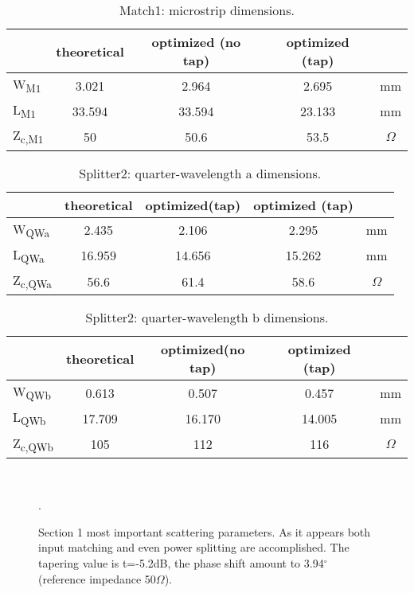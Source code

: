 \begin{table} [h]
	\label{tab:21_sec2DimM1}
	\caption{Match1: microstrip dimensions.}
	\centering	
	\begin{tabular}{lcccc} 
		\toprule
		& theoretical & optimized (no tap)& optimized (tap)&\\
		\midrule 
		W\textsubscript{M1} 	&	3.021		&	2.964	&2.695& mm 		\\
		L\textsubscript{M1}		&	33.594		& 	33.594	&23.133& mm		\\ 
		Z\textsubscript{c,M1}	&	50			& 	50.6	&53.5& $\Omega$		\\
		\bottomrule
	\end{tabular}	
\end{table}
\begin{table} [h!]
	\label{tab:p2_sec2DimQWa}
	\caption{Splitter2: quarter-wavelength a dimensions.}
	\centering	
	\begin{tabular}{lcccc} 
		\toprule
		& theoretical & optimized(tap) &optimized (tap)&\\
		\midrule 
		W\textsubscript{QWa} 	&	2.435		&	2.106	&2.295& mm		\\
		L\textsubscript{QWa}	&	16.959		& 	14.656	&15.262& mm		\\ 
		Z\textsubscript{c,QWa}	&	56.6		& 	61.4	&58.6& $\Omega$		\\
		\bottomrule
	\end{tabular}	
\end{table}
\begin{table} [h!]
	\label{tab:p2sec2DimQWb}
	\caption{Splitter2: quarter-wavelength b dimensions.}
	\centering	
	\begin{tabular}{lcccc} 
		\toprule
		& theoretical & optimized(no tap) &optimized (tap)&\\
		\midrule 
		W\textsubscript{QWb} 	&	0.613		&	0.507	&0.457& mm		\\
		L\textsubscript{QWb}	&	17.709		& 	16.170	&14.005& mm		\\ 
		Z\textsubscript{c,QWb}	&	105			& 	112		&116& $\Omega$		\\
		\bottomrule
	\end{tabular}	
\end{table}
\newpage

\begin{figure}[h!] 
	\centering
	\quad
	\\
	\caption{Section 1 most important scattering parameters. As it appears both input matching and even power splitting are accomplished. The tapering value is t=-5.2dB, the phase shift amount to 3.94$^\circ$ (reference impedance 50$\Omega$).}.
	\label{fig:p2_sec1Scatt}
\end{figure}

